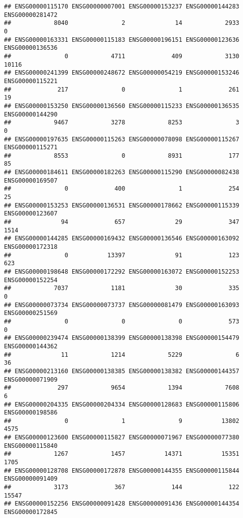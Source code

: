 \documentclass[
]{article}
\begin{document}
\begin{verbatim}
## ENSG00000115170 ENSG00000007001 ENSG00000153237 ENSG00000144283 ENSG00000281472 
##            8040               2              14            2933               0 
## ENSG00000163331 ENSG00000115183 ENSG00000196151 ENSG00000123636 ENSG00000136536 
##               0            4711             409            3130           10116 
## ENSG00000241399 ENSG00000248672 ENSG00000054219 ENSG00000153246 ENSG00000115221 
##             217               0               1             261              19 
## ENSG00000153250 ENSG00000136560 ENSG00000115233 ENSG00000136535 ENSG00000144290 
##            9467            3278            8253               3               0 
## ENSG00000197635 ENSG00000115263 ENSG00000078098 ENSG00000115267 ENSG00000115271 
##            8553               0            8931             177              85 
## ENSG00000184611 ENSG00000182263 ENSG00000115290 ENSG00000082438 ENSG00000169507 
##               0             400               1             254              25 
## ENSG00000153253 ENSG00000136531 ENSG00000178662 ENSG00000115339 ENSG00000123607 
##              94             657              29             347            1514 
## ENSG00000144285 ENSG00000169432 ENSG00000136546 ENSG00000163092 ENSG00000172318 
##               0           13397              91             123             623 
## ENSG00000198648 ENSG00000172292 ENSG00000163072 ENSG00000152253 ENSG00000152254 
##            7037            1181              30             335               0 
## ENSG00000073734 ENSG00000073737 ENSG00000081479 ENSG00000163093 ENSG00000251569 
##               0               0               0             573               0 
## ENSG00000239474 ENSG00000138399 ENSG00000138398 ENSG00000154479 ENSG00000144362 
##              11            1214            5229               6              36 
## ENSG00000213160 ENSG00000138385 ENSG00000138382 ENSG00000144357 ENSG00000071909 
##             297            9654            1394            7608               6 
## ENSG00000204335 ENSG00000204334 ENSG00000128683 ENSG00000115806 ENSG00000198586 
##               0               1               9           13802            4575 
## ENSG00000123600 ENSG00000115827 ENSG00000071967 ENSG00000077380 ENSG00000115840 
##            1267            1457           14371           15351            1705 
## ENSG00000128708 ENSG00000172878 ENSG00000144355 ENSG00000115844 ENSG00000091409 
##            3173             367             144             122           15547 
## ENSG00000152256 ENSG00000091428 ENSG00000091436 ENSG00000144354 ENSG00000172845 

\end{verbatim}
\end{document}
